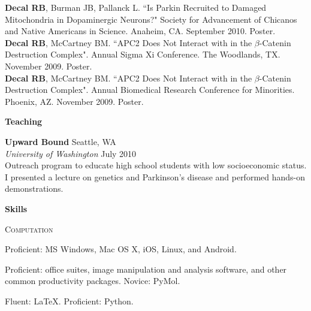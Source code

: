 \documentclass[a4paper,12pt]{article}
\newcommand{\resheading}[1]{{\vspace*{.06in} \colorbox{mygrey}{\begin{minipage}{\textwidth}{\textmd{\large \textbf{#1} \vphantom{p\^{E}}}}\end{minipage}}} }
\newcommand{\ressubheading}[4]{
        \textbf{#1} \hfill #2\\
        \textit{#3} \hfill #4 \\}
\begin{document}
    \textbf{Decal RB}, Burman JB, Pallanck L. ``Is Parkin Recruited to Damaged Mitochondria in Dopaminergic Neurons?" Society for Advancement of Chicanos and Native Americans in Science.  Anaheim, CA. September 2010. Poster.\\

    \textbf{Decal RB}, McCartney BM. ``APC2 Does Not Interact with in the $\beta$-Catenin Destruction Complex". Annual Sigma Xi Conference. The Woodlands, TX. November 2009. Poster.\\

    \textbf{Decal RB}, McCartney BM. ``APC2 Does Not Interact with in the $\beta$-Catenin Destruction Complex". Annual Biomedical Research Conference for Minorities. Phoenix, AZ. November 2009. Poster.\\
        
\resheading{Teaching}

    \ressubheading{Upward Bound}{Seattle, WA}{University of Washington}{July 2010}
    Outreach program to educate high school students with low socioeconomic status. I presented a lecture on genetics and Parkinson's disease and performed hands-on demonstrations.\\        
        
\resheading{Skills}

    \textsc{Computation}
        \begin{description}\setlength{\itemsep}{0mm}
        \item[Operating Systems] Proficient: MS Windows, Mac OS X, iOS, Linux, and Android.
        \item[Software] Proficient: office suites, image manipulation and analysis software, and other common productivity packages. Novice: PyMol.
        \item[Programming] Fluent: \LaTeX. Proficient: Python.
        \end{description}
\end{document}
